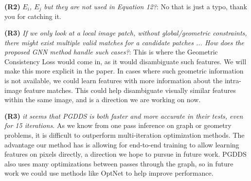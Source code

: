 \documentclass[10pt,twocolumn,letterpaper]{article}
\begin{document}
\textbf{(R2)} \textit{$E_i$, $E_j$ but they are not used in Equation 12?}:
No that is just a typo, thank you for catching it.

\textbf{(R3)} \textit{If we only look at a local image patch, without global/geometric constraints, there might exist multiple valid matches for a candidate patches ... How does the proposed GNN method handle such cases?}:
This is where the Geometric Consistency Loss would come in, as it would disambiguate such features.
We will make this more explicit in the paper.
In cases where such geometric information is not available, we could learn features with more information about the intra-image feature matches.
This could help disambiguate visually similar features within the same image, and is a direction we are working on now.

\textbf{(R3)} \textit{it seems that PGDDS is both faster and more accurate in their tests, even for 15 iterations.}
As we know from one pass inference on graph or geometry problems, it is difficult to outperform multi-iteration optimization methods.
The advantage our method has is allowing for end-to-end training to allow learning features on pixels directly, a direction we hope to pursue in future work.
PGDDS also uses many optimizations between passes through the graph, so in future work we could use methods like OptNet \cite{amos2017optnet} to help improve performance.




{\tiny


}
\end{document}
